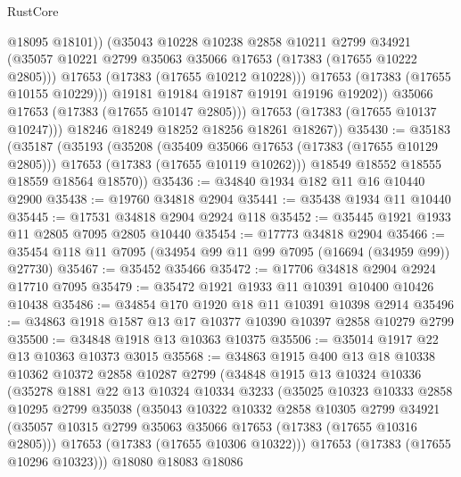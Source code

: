 \begin{lexlean}{RustCore}
\begin{coremodule}
                      @18095
                      @18101))
                  (@35043
                    @10228
                    @10238
                    @2858
                    @10211
                    @2799
                    @34921
                    (@35057 @10221 @2799 @35063 @35066 @17653 (@17383 (@17655 @10222 @2805)))
                    @17653
                    (@17383 (@17655 @10212 @10228)))
                  @17653
                  (@17383 (@17655 @10155 @10229)))
                @19181
                @19184
                @19187
                @19191
                @19196
                @19202))
            @35066
            @17653
            (@17383 (@17655 @10147 @2805)))
          @17653
          (@17383 (@17655 @10137 @10247)))
        @18246
        @18249
        @18252
        @18256
        @18261
        @18267))
@35430 := @35183
    (@35187
      (@35193
        (@35208
          (@35409 @35066 @17653 (@17383 (@17655 @10129 @2805)))
          @17653
          (@17383 (@17655 @10119 @10262)))
        @18549
        @18552
        @18555
        @18559
        @18564
        @18570))
@35436 := @34840 @1934 @182 @11 @16 @10440 @2900
@35438 := @19760 @34818 @2904
@35441 := @35438 @1934 @11 @10440
@35445 := @17531 @34818 @2904 @2924 @118
@35452 := @35445 @1921 @1933 @11 @2805 @7095 @2805 @10440
@35454 := @17773 @34818 @2904
@35466 := @35454 @118 @11 @7095 (@34954 @99 @11 @99 @7095 (@16694 (@34959 @99)) @27730)
@35467 := @35452 @35466
@35472 := @17706 @34818 @2904 @2924 @17710 @7095
@35479 := @35472 @1921 @1933 @11 @10391 @10400 @10426 @10438
@35486 := @34854 @170 @1920 @18 @11 @10391 @10398 @2914
@35496 := @34863 @1918 @1587 @13 @17 @10377 @10390 @10397 @2858 @10279 @2799
@35500 := @34848 @1918 @13 @10363 @10375
@35506 := @35014 @1917 @22 @13 @10363 @10373 @3015
@35568 := @34863
    @1915
    @400
    @13
    @18
    @10338
    @10362
    @10372
    @2858
    @10287
    @2799
    (@34848
      @1915
      @13
      @10324
      @10336
      (@35278
        @1881
        @22
        @13
        @10324
        @10334
        @3233
        (@35025
          @10323
          @10333
          @2858
          @10295
          @2799
          @35038
          (@35043
            @10322
            @10332
            @2858
            @10305
            @2799
            @34921
            (@35057 @10315 @2799 @35063 @35066 @17653 (@17383 (@17655 @10316 @2805)))
            @17653
            (@17383 (@17655 @10306 @10322)))
          @17653
          (@17383 (@17655 @10296 @10323)))
        @18080
        @18083
        @18086

\end{coremodule}
\end{lexlean}
